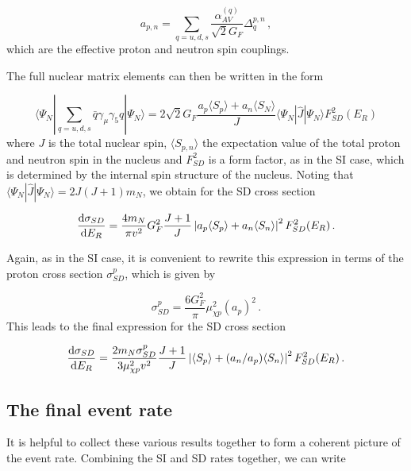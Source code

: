 \begin{equation}
a_{p,n} = \sum_{q = u,d,s} \frac{\alpha_{AV}^{(q)}}{\sqrt{2}G_F} \Delta_q^{p,n}\,,
\end{equation}
which are the effective proton and neutron spin couplings. 

The full nuclear matrix elements can then be written in the form  

\begin{equation}
\langle \Psi_N | \sum_{q=u,d,s} \bar{q} \gamma_\mu \gamma_5 q | \Psi_N \rangle = 2 \sqrt{2} G_F \frac{a_p \langle S_p \rangle + a_n \langle S_N \rangle}{J} \langle \Psi_N | \hat{J} | \Psi_N \rangle F_{SD}^2(E_R)
\end{equation}
where $J$ is the total nuclear spin, $\langle S_{p,n} \rangle$ the expectation value of the total proton and neutron spin in the nucleus and $F_{SD}^2$ is a form factor, as in the SI case, which is determined by the internal spin structure of the nucleus. Noting that $\langle \Psi_N | \hat{J} | \Psi_N \rangle = 2J(J+1)m_N$, we obtain for the SD cross section

\begin{equation}
\frac{\mathrm{d}\sigma_{SD}}{\mathrm{d}E_R} = \frac{4 m_N}{\pi v^2} G_F^2 \frac{J + 1}{J} \left| a_p \langle S_p \rangle + a_n \langle S_n \rangle \right|^2 F_{SD}^2(E_R)\,.
\end{equation}

Again, as in the SI case, it is convenient to rewrite this expression in terms of the proton cross section $\sigma_{SD}^p$, which is given by %

\begin{equation}
\sigma_{SD}^{p} = \frac{6 G_F^2}{\pi} \mu_{\chi p}^2 (a_p)^2\,.
\end{equation}
This leads to the final expression for the SD cross section

\begin{equation}
\label{DD:eq:sigsd}
\frac{\mathrm{d}\sigma_{SD}}{\mathrm{d}E_R} = \frac{2 m_N \sigma_{SD}^p}{3 \mu_{\chi p}^2 v^2} \frac{J+1}{J} \left| \langle S_p \rangle + (a_n/a_p) \langle S_n \rangle \right|^2 F_{SD}^2(E_R)\,.
\end{equation}

\subsection{The final event rate}

It is helpful to collect these various results together to form a coherent picture of the event rate. Combining the SI and SD rates together, we can write

